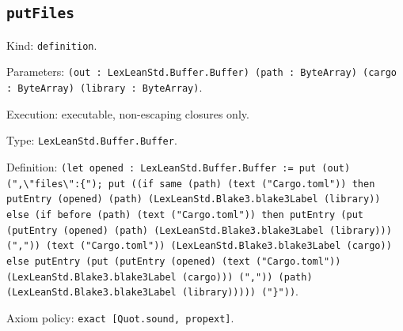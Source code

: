 \documentclass[11pt]{article}
\begin{document}
\subsection*{\texttt{putFiles}}
\noindent Kind: \texttt{definition}.\par
\noindent Parameters: \texttt{(out : LexLeanStd.Buffer.Buffer) (path : ByteArray) (cargo : ByteArray) (library : ByteArray)}.\par
\noindent Execution: executable, non-escaping closures only.\par
\noindent Type: \texttt{LexLeanStd.Buffer.Buffer}.\par
\noindent Definition: \texttt{(let opened : LexLeanStd.Buffer.Buffer := put (out) (",\textbackslash{}"files\textbackslash{}":\{"); put ((if same (path) (text ("Cargo.toml")) then putEntry (opened) (path) (LexLeanStd.Blake3.blake3Label (library)) else (if before (path) (text ("Cargo.toml")) then putEntry (put (putEntry (opened) (path) (LexLeanStd.Blake3.blake3Label (library))) (",")) (text ("Cargo.toml")) (LexLeanStd.Blake3.blake3Label (cargo)) else putEntry (put (putEntry (opened) (text ("Cargo.toml")) (LexLeanStd.Blake3.blake3Label (cargo))) (",")) (path) (LexLeanStd.Blake3.blake3Label (library))))) ("\}"))}.\par
\noindent Axiom policy: \texttt{exact [Quot.sound, propext]}.\par
\end{document}
